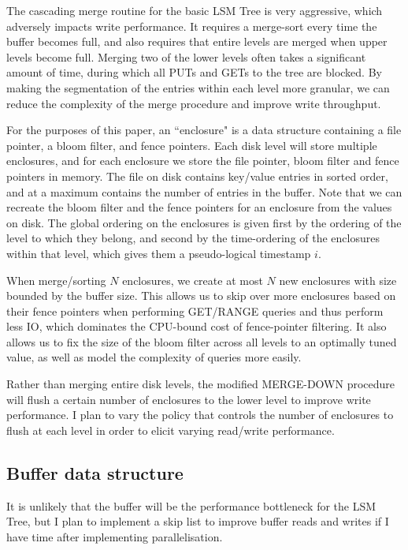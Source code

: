 \documentclass[format=acmtog, review=false]{acmart}
\begin{document}
The cascading merge routine for the basic LSM Tree is very aggressive, which adversely impacts write performance. It requires a merge-sort every time the buffer becomes full, and also requires that entire levels are merged when upper levels become full. Merging two of the lower levels often takes a significant amount of time, during which all PUTs and GETs to the tree are blocked. By making the segmentation of the entries within each level more granular, we can reduce the complexity of the merge procedure and improve write throughput.

For the purposes of this paper, an ``enclosure" is a data structure containing a file pointer, a bloom filter, and fence pointers. Each disk level will store multiple enclosures, and for each enclosure we store the file pointer, bloom filter and fence pointers in memory. The file on disk contains key/value entries in sorted order, and at a maximum contains the number of entries in the buffer. Note that we can recreate the bloom filter and the fence pointers for an enclosure from the values on disk. The global ordering on the enclosures is given first by the ordering of the level to which they belong, and second by the time-ordering of the enclosures within that level, which gives them a pseudo-logical timestamp $i$. 

When merge/sorting $N$ enclosures, we create at most $N$ new enclosures with size bounded by the buffer size. This allows us to skip over more enclosures based on their fence pointers when performing GET/RANGE queries and thus perform less IO, which dominates the CPU-bound cost of fence-pointer filtering. It also allows us to fix the size of the bloom filter across all levels to an optimally tuned value, as well as model the complexity of queries more easily.

Rather than merging entire disk levels, the modified MERGE-DOWN procedure will flush a certain number of enclosures to the lower level to improve write performance. I plan to vary the policy that controls the number of enclosures to flush at each level in order to elicit varying read/write performance.

\subsection{Buffer data structure}

It is unlikely that the buffer will be the performance bottleneck for the LSM Tree, but I plan to implement a skip list to improve buffer reads and writes if I have time after implementing parallelisation.
\end{document}
